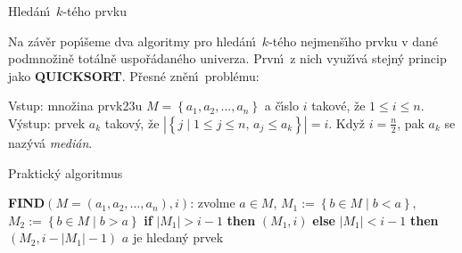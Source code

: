 \subhead
Hled\'an\'\i\ $k$-t\'eho prvku
\endsubhead
\smallskip

\flushpar Na z\'av\v er pop\'\i\v seme dva algoritmy pro hled\'an\'\i\ $
k$-t\'eho 
nejmen\v s\'\i\-ho prvku v dan\'e podmno\v zin\v e tot\'aln\v e 
uspo\v r\'adan\'e\-ho univerza. Prv\-n\'\i\ z nich vyu\v z\'\i v\'a  
stejn\'y princip jako {\bf QUICKSORT}. P\v res\-n\'e zn\v e\-n\'\i\ 
probl\'emu:
\medskip

\flushpar Vstup: mno\v zina prvk\accent23u $M=\left\{a_1,a_2,\dots,a_n
\right\}$ a \v c\'\i slo $i$ takov\'e, 
\v ze $1\le i\le n$.\newline 
V\'ystup: prvek $a_k$ takov\'y, \v ze 
$|\left\{j\mid 1\le j\le n,\,a_j\le a_k\right\}|=i$.\newline 
Kdy\v z $i=\frac n2$, pak $a_k$ se naz\'yv\'a \emph{medi\'an}.
\medskip

\subhead
Praktick\'y algoritmus
\endsubhead
\medskip

{\bf FIND}$\left(M=\left(a_1,a_2,\dots,a_n\right),i\right)$:\newline 
zvolme $a\in M$, $M_1:=\left\{b\in M\mid b<a\right\}$, 
$M_2:=\left\{b\in M\mid b>a\right\}$\newline 
{\bf if} $|M_1|>i-1$ {\bf then}\newline 
\phantom{---}{\bf FIND}$\left(M_1,i\right)$\newline 
{\bf else}\newline 
\phantom{---}{\bf if} $|M_1|<i-1$ {\bf then}\newline 
\phantom{------}{\bf FIND}$\left(M_2,i-|M_1|-1\right)$\newline 
\phantom{---}{\bf else}\newline 
\phantom{------}$a$ je hledan\'y prvek\newline 
\phantom{---}{\bf endif\newline 
endif}
\bigskip

